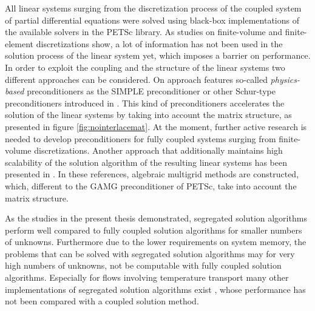 All linear systems surging from the discretization process of the coupled system of partial differential equations were solved using black-box implementations of the available solvers in the PETSc library. As studies on finite-volume \cite{klaij13,darwish09,mangani14} and finite-element \cite{brown12,elman03,elman08,silvester01,turek02,mcinnes14} discretizations show, a lot of information has not been used in the solution process of the linear system yet, which imposes a barrier on performance. In order to exploit the coupling and the structure of the linear systems two different approaches can be considered. On approach features so-called \emph{physics-based} preconditioners as the SIMPLE preconditioner or other Schur-type preconditioners introduced in \cite{klaij13,elman08}. This kind of preconditioners accelerates the solution of the linear systems by taking into account the matrix structure, as presented in figure \ref{fig:nointerlacemat}. At the moment, further active research is needed to develop preconditioners for fully coupled systems surging from finite-volume discretizations. Another approach that additionally maintains high scalability of the solution algorithm of the resulting linear systems has been presented in \cite{darwish09,mangani14}. In these references, algebraic multigrid methods are constructed, which, different to the GAMG preconditioner of PETSc, take into account the matrix structure.

As the studies in the present thesis demonstrated, segregated solution algorithms perform well compared to fully coupled solution algorithms for smaller numbers of unknowns. Furthermore due to the lower requirements on system memory, the problems that can be solved with segregated solution algorithms may for very high numbers of unknowns, not be computable with fully coupled solution algorithms. Especially for flows involving temperature transport many other implementations of segregated solution algorithms exist \cite{liu84,oliveira01}, whose performance has not been compared with a coupled solution method.

